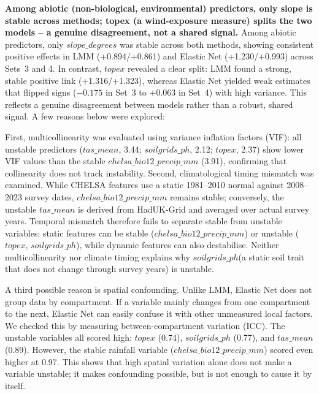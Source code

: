 \documentclass[logo,msc,ai]{infthesis}           %
\begin{document}
\textbf{Among abiotic (non-biological, environmental) predictors, only slope is stable across methods; topex (a wind-exposure measure) splits the two models -- a genuine disagreement, not a shared signal.}
Among abiotic predictors, only $\mathit{slope\_degrees}$ was stable across both methods, showing consistent positive effects in LMM (+0.894/+0.861) and Elastic Net (+1.230/+0.993) across Sets~3 and 4. In contrast, $\mathit{topex}$ revealed a clear split: LMM found a strong, stable positive link (+1.316/+1.323), whereas Elastic Net yielded weak estimates that flipped signs ($-0.175$ in Set~3 to $+0.063$ in Set~4) with high variance. This reflects a genuine disagreement between models rather than a robust, shared signal. A few reasons below were explored: 

First, multicollinearity was evaluated using variance inflation factors (VIF): all unstable predictors ($\mathit{tas\_mean}$, 3.44; $\mathit{soilgrids\_ph}$, 2.12; $\mathit{topex}$, 2.37) show lower VIF values than the stable $\mathit{chelsa\_bio12\_precip\_mm}$ (3.91), confirming that collinearity does not track instability. 
Second, climatological timing mismatch was examined. While CHELSA features use a static 1981--2010 normal against 2008--2023 survey dates, $\mathit{chelsa\_bio12\_precip\_mm}$ remains stable; conversely, the unstable $\mathit{tas\_mean}$ is derived from HadUK-Grid and averaged over actual survey years. Temporal mismatch therefore fails to separate stable from unstable variables: static features can be stable ($\mathit{chelsa\_bio12\_precip\_mm}$) or unstable ($\mathit{topex}$, $\mathit{soilgrids\_ph}$), while dynamic features can also destabilise. 
Neither multicollinearity nor climate timing explains why $\mathit{soilgrids\_ph}$(a static soil trait that does not change through survey years) is unstable.

A third possible reason is spatial confounding. Unlike LMM, Elastic Net does not group data by compartment. If a variable mainly changes from one compartment to the next, Elastic Net can easily confuse it with other unmeasured local factors. We checked this by measuring between-compartment variation (ICC). The unstable variables all scored high: $\mathit{topex}$ (0.74), $\mathit{soilgrids\_ph}$ (0.77), and $\mathit{tas\_mean}$ (0.89). However, the stable rainfall variable ($\mathit{chelsa\_bio12\_precip\_mm}$) scored even higher at 0.97. This shows that high spatial variation alone does not make a variable unstable; it makes confounding possible, but is not enough to cause it by itself.
\end{document}
